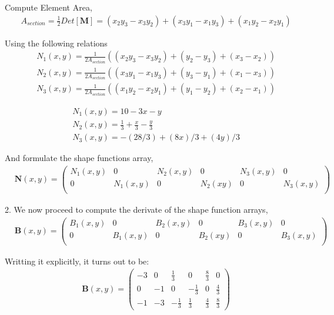 \documentclass[a4paper]{memoir}
\begin{document}
Compute Element Area,
\begin{align*}
	& A_{section} = \frac{1}{2}Det[\textbf{M}] = (x_2y_3-x_3y_2)+(x_3y_1-x_1y_3)+(x_1y_2-x_2y_1)
\end{align*}

Using the following relations
\begin{align*}
	& N_1(x,y) = \frac{1}{2A_{section}} ((x_2y_3-x_3y_2)+(y_2-y_3)+(x_3-x_2)) \\
	& N_2(x,y) = \frac{1}{2A_{section}} ((x_3y_1-x_1y_3)+(y_3-y_1)+(x_1-x_3)) \\
	& N_3(x,y) = \frac{1}{2A_{section}} ((x_1y_2-x_2y_1)+(y_1-y_2)+(x_2-x_1))
\end{align*}

\begin{align*}
	& N_1(x,y) = 10 - 3 x - y \\
	& N_2(x,y) = \frac{1}{3}+\frac{x}{3}-\frac{y}{3} \\
	& N_3(x,y) = -(28/3) + (8 x)/3 + (4 y)/3
\end{align*}

And formulate the shape functions array,
\begin{align*}
	&\textbf{N}(x,y) = 
	\left(
	\begin{array}{cccccc}
	 N_1(x,y) & 0 			& N_2(x,y) & 0 			& N_3(x,y) 	& 0 		 \\
	 0 			& N_1(x,y) 	& 0 		 	& N_2(xy) & 0 			& N_3(x,y) \\
	\end{array}
	\right)
\end{align*}

2. We now proceed to compute the derivate of the shape function arrays,
\begin{align*}
	&\textbf{B}(x,y) = 
	\left(
	\begin{array}{cccccc}
	 B_1(x,y) & 0 			& B_2(x,y) & 0 			& B_3(x,y) 	& 0 		 \\
	 0 			& B_1(x,y) 	& 0 		 	& B_2(xy) & 0 			& B_3(x,y) \\
	\end{array}
	\right)
\end{align*}

Writting it explicitly, it turns out to be:
\begin{align*}
	&\textbf{B}(x,y) = 
	\left(
\begin{array}{cccccc}
 -3 & 0 & \frac{1}{3} & 0 & \frac{8}{3} & 0 \\
 0 & -1 & 0 & -\frac{1}{3} & 0 & \frac{4}{3} \\
 -1 & -3 & -\frac{1}{3} & \frac{1}{3} & \frac{4}{3} & \frac{8}{3}
\end{array}
\right)
\end{align*}
\end{document}
